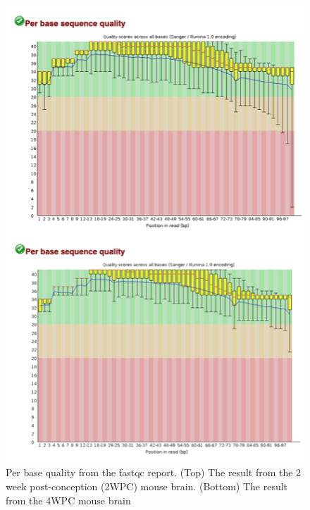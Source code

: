 \documentclass[
]{book}
\begin{document}
\begin{figure}
\centering
\includegraphics{figures/per_base_quality.png}
\caption{Per base quality from the fastqc report. (Top) The result from the 2 week post-conception (2WPC) mouse brain. (Bottom) The result from the 4WPC mouse brain}
\end{figure}
\end{document}
